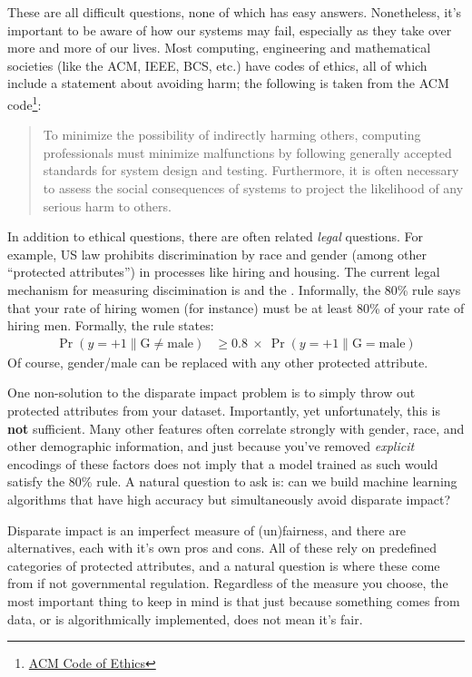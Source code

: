 These are all difficult questions, none of which has easy answers.
Nonetheless, it's important to be aware of how our systems may fail, especially as they take over more and more of our lives.
Most computing, engineering and mathematical societies (like the ACM, IEEE, BCS, etc.) have codes of ethics, all of which include a statement about avoiding harm; the following is taken from the ACM code\footnote{\href{https://www.acm.org/about-acm/acm-code-of-ethics-and-professional-conduct}{ACM Code of Ethics}}:
\begin{quote}
  To minimize the possibility of indirectly harming others, computing professionals must minimize malfunctions by following generally accepted standards for system design and testing. Furthermore, it is often necessary to assess the social consequences of systems to project the likelihood of any serious harm to others.
\end{quote}

In addition to ethical questions, there are often related \emph{legal} questions.
For example, US law prohibits discrimination by race and gender (among other ``protected attributes'') in processes like hiring and housing.
The current legal mechanism for measuring discimination is  and the .
Informally, the 80\% rule says that your rate of hiring women (for instance) must be at least 80\% of your rate of hiring men.
Formally, the rule states:
\begin{align}
                    \Pr(y = +1 \| \text{G} \neq \text{male}) 
& \geq 0.8 ~\times~ \Pr(y = +1 \| \text{G} =    \text{male}) 
\end{align}
Of course, gender/male can be replaced with any other protected attribute.

One non-solution to the disparate impact problem is to simply throw out protected attributes from your dataset.
Importantly, yet unfortunately, this is \textbf{not} sufficient.
Many other features often correlate strongly with gender, race, and other demographic information, and just because you've removed \emph{explicit} encodings of these factors does not imply that a model trained as such would satisfy the 80\% rule.
A natural question to ask is: can we build machine learning algorithms that have high accuracy but simultaneously avoid disparate impact?

Disparate impact is an imperfect measure of (un)fairness, and there are alternatives, each with it's own pros and cons.
All of these rely on predefined categories of protected attributes, and a natural question is where these come from if not governmental regulation.
Regardless of the measure you choose, the most important thing to keep in mind is that just because something comes from data, or is algorithmically implemented, does not mean it's fair.


